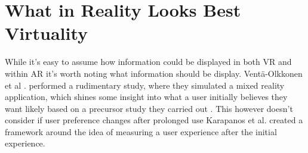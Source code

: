 \documentclass{scrartcl}
\begin{document}
\section{What in Reality Looks Best Virtuality}
While it's easy to assume how information could be displayed in both VR and within AR it's worth noting what information should be display. Ventä-Olkkonen et al \cite{venta2014investigating}. performed a rudimentary study, where they simulated a mixed reality application, which shines some insight into what a user initially believes they want likely based on a precursor study they carried out \cite{venta2012user}. This however doesn't consider if user preference changes after prolonged use Karapanos et al. \cite{karapanos2009user} created a framework around the idea of measuring a user experience after the initial experience.




\end{document}
